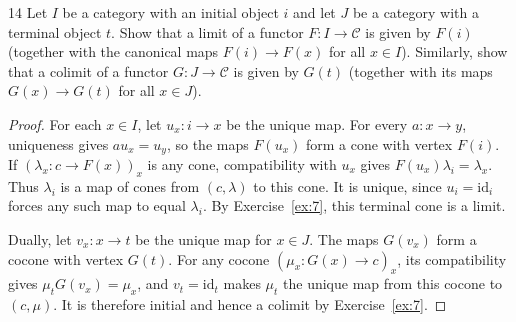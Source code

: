 \begin{exercise}{14}
Let $I$ be a category with an initial object $i$ and let $J$ be a
category with a terminal object $t$. Show that a limit of a functor
$F\colon I\to\mathcal C$ is given by $F(i)$ (together with the
canonical maps $F(i)\to F(x)$ for all $x\in I$). Similarly, show that
a colimit of a functor $G\colon J\to\mathcal C$ is given by $G(t)$
(together with its maps $G(x)\to G(t)$ for all $x\in J$).

\begin{proof}
For each $x\in I$, let $u_x\colon i\to x$ be the unique map.
For every $a\colon x\to y$, uniqueness gives $au_x=u_y$, so the
maps $F(u_x)$ form a cone with vertex $F(i)$.
If $(\lambda_x\colon c\to F(x))_x$ is any cone, compatibility with
$u_x$ gives $F(u_x)\lambda_i=\lambda_x$. Thus $\lambda_i$ is a map
of cones from $(c,\lambda)$ to this cone. It is unique, since
$u_i=\mathrm{id}_i$ forces any such map to equal $\lambda_i$.
By Exercise~\ref{ex:7}, this terminal cone is a limit.

Dually, let $v_x\colon x\to t$ be the unique map for $x\in J$.
The maps $G(v_x)$ form a cocone with vertex $G(t)$.
For any cocone $(\mu_x\colon G(x)\to c)_x$, its compatibility gives
$\mu_tG(v_x)=\mu_x$, and $v_t=\mathrm{id}_t$ makes $\mu_t$ the
unique map from this cocone to $(c,\mu)$. It is therefore initial
and hence a colimit by Exercise~\ref{ex:7}.
\end{proof}
\end{exercise}
